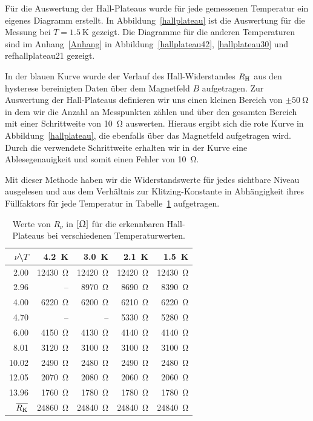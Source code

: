 \documentclass[paper=a4,fontsize=10pt,DIV=18,twocolumn,parskip=half]{scrartcl}
\numberwithin{equation}{section}    %
\begin{document}
Für die Auswertung der Hall-Plateaus wurde für jede gemessenen Temperatur ein eigenes Diagramm erstellt. In Abbildung~\ref{hallplateau} ist die Auswertung für die Messung bei $T=\SI{1.5}{\kelvin}$ gezeigt. Die Diagramme für die anderen Temperaturen sind im Anhang~\ref{Anhang} in Abbildung~\ref{hallplateau42}, \ref{hallplateau30} und~\\ref{hallplateau21} gezeigt.

In der blauen Kurve wurde der Verlauf des Hall-Widerstandes $R_{\rm H}$ aus den hysterese bereinigten Daten über dem Magnetfeld $B$ aufgetragen.
Zur Auswertung der Hall-Plateaus definieren wir uns einen kleinen Bereich von $\pm \SI{50}{\ohm}$ in dem wir die Anzahl an Messpunkten zählen und über den gesamten Bereich mit einer Schrittweite von \SI{10}{\ohm} auswerten. Hieraus ergibt sich die rote Kurve in Abbildung~\ref{hallplateau}, die ebenfalls über das Magnetfeld aufgetragen wird. Durch die verwendete Schrittweite erhalten wir in der Kurve eine Ablesegenauigkeit und somit einen Fehler von \SI{10}{\ohm}.

Mit dieser Methode haben wir die Widerstandswerte für jedes sichtbare Niveau ausgelesen und aus dem Verhältnis zur Klitzing-Konstante in Abhängigkeit ihres Füllfaktors für jede Temperatur in Tabelle~\ref{klitzing} aufgetragen.

\begin{table}[htp]
	\begin{center}
	\begin{tabular}{r|rrrr}
		$\nu$\textbackslash$T$ & \SI{4.2}{\kelvin} & \SI{3.0}{\kelvin} & \SI{2.1}{\kelvin} & \SI{1.5}{\kelvin} \\
		\hline
		2.00  & \SI{12430}{\ohm} & \SI{12420}{\ohm} & \SI{12420}{\ohm} & \SI{12430}{\ohm}\\
		2.96  &      \--- &  \SI{8970}{\ohm} &  \SI{8690}{\ohm} &  \SI{8390}{\ohm}\\
		4.00  &  \SI{6220}{\ohm} &  \SI{6200}{\ohm} &  \SI{6210}{\ohm} &  \SI{6220}{\ohm}\\
		4.70  &      \--- &      \--- &  \SI{5330}{\ohm} &  \SI{5280}{\ohm}\\
		6.00  &  \SI{4150}{\ohm} &  \SI{4130}{\ohm} &  \SI{4140}{\ohm} &  \SI{4140}{\ohm}\\
		8.01  &  \SI{3120}{\ohm} &  \SI{3100}{\ohm} &  \SI{3100}{\ohm} &  \SI{3100}{\ohm}\\
		10.02 &  \SI{2490}{\ohm} &  \SI{2480}{\ohm} &  \SI{2490}{\ohm} &  \SI{2480}{\ohm}\\
		12.05 &  \SI{2070}{\ohm} &  \SI{2080}{\ohm} &  \SI{2060}{\ohm} &  \SI{2060}{\ohm}\\
		13.96 &  \SI{1760}{\ohm} &  \SI{1780}{\ohm} &  \SI{1780}{\ohm} &  \SI{1780}{\ohm}\\
		\hline
		$\overline{R_{\rm K}}$ & \SI{24860}{\ohm} & \SI{24840}{\ohm} & \SI{24840}{\ohm} & \SI{24840}{\ohm}
		
	\end{tabular}
	\caption{Werte von $R_\nu$ in $\left[\Upomega\right]$ für die erkennbaren Hall-Plateaus bei verschiedenen Temperaturwerten.}
	\label{klitzing}	
	\end{center}
\end{table}
\end{document}
